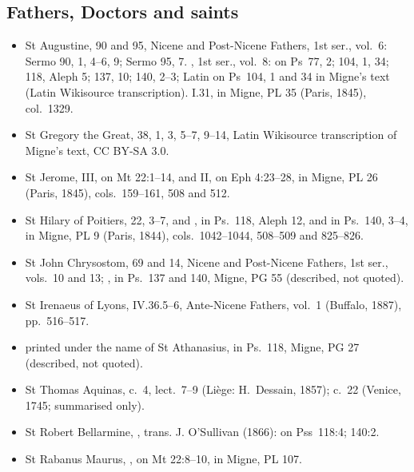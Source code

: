 {\subsection*{Fathers, Doctors and saints}
\begin{itemize}\setlength{\itemsep}{0.15em}\setlength{\parskip}{0pt}
\item St Augustine,  90 and 95, Nicene and Post-Nicene Fathers, 1st ser., vol.~6: Sermo 90, 1, 4--6, 9; Sermo 95, 7. , 1st ser., vol.~8: on Ps~77, 2; 104, 1, 34; 118, Aleph 5; 137, 10; 140, 2--3; Latin on Ps~104, 1 and 34 in Migne's text (Latin Wikisource transcription).  I.31, in Migne, PL 35 (Paris, 1845), col.~1329.
\item St Gregory the Great,  38, 1, 3, 5--7, 9--14, Latin Wikisource transcription of Migne's text, CC BY-SA 3.0.
\item St Jerome,  III, on Mt 22:1--14, and  II, on Eph 4:23--28, in Migne, PL 26 (Paris, 1845), cols.~159--161, 508 and 512.
\item St Hilary of Poitiers,  22, 3--7, and , in Ps.~118, Aleph 12, and in Ps.~140, 3--4, in Migne, PL 9 (Paris, 1844), cols.~1042--1044, 508--509 and 825--826.
\item St John Chrysostom,  69 and  14, Nicene and Post-Nicene Fathers, 1st ser., vols.~10 and 13; , in Ps.~137 and 140, Migne, PG 55 (described, not quoted).
\item St Irenaeus of Lyons,  IV.36.5--6, Ante-Nicene Fathers, vol.~1 (Buffalo, 1887), pp.~516--517.
\item {} printed under the name of St Athanasius, in Ps.~118, Migne, PG 27 (described, not quoted).
\item St Thomas Aquinas,  c.~4, lect.~7--9 (Liège: H.~Dessain, 1857);  c.~22 (Venice, 1745; summarised only).
\item St Robert Bellarmine, , trans. J. O'Sullivan (1866): on Pss~118:4; 140:2.
\item St Rabanus Maurus, , on Mt 22:8--10, in Migne, PL 107.
\end{itemize}

}
